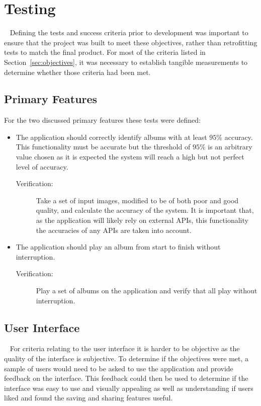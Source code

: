 \section{Testing}~\label{sec:test-design}
Defining the tests and success criteria prior to development was important to ensure that the project was built to meet these objectives, rather than retrofitting tests to match the final product. For most of the criteria listed in Section~\ref{sec:objectives}, it was necessary to establish tangible measurements to determine whether those criteria had been met.

\subsection{Primary Features}
For the two discussed primary features these tests were defined:
\begin{itemize}
    \item The application should correctly identify albums with at least $95\%$ accuracy. This functionality must be accurate but the threshold of $95\%$ is an arbitrary value chosen as it is expected the system will reach a high but not perfect level of accuracy.
    \begin{description}
        \item[Verification:] Take a set of input images, modified to be of both poor and good quality, and calculate the accuracy of the system. It is important that, as the application will likely rely on external APIs, this functionality the accuracies of any APIs are taken into account.
    \end{description}
    \item The application should play an album from start to finish without interruption.
    \begin{description}
        \item[Verification:] Play a set of albums on the application and verify that all play without interruption.
    \end{description}
\end{itemize}

\subsection{User Interface}~\label{sec:ui-tests}
For criteria relating to the user interface it is harder to be objective as the quality of the interface is subjective. To determine if the objectives were met, a sample of users would need to be asked to use the application and provide feedback on the interface. This feedback could then be used to determine if the interface was easy to use and visually appealing as well as understanding if users liked and found the saving and sharing features useful.

